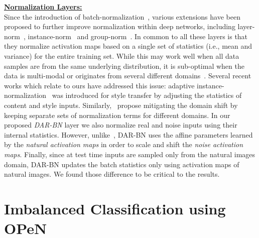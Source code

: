 \documentclass[nohyperref]{article}
\theoremstyle{plain}
\theoremstyle{definition}
\theoremstyle{remark}
\begin{document}
\noindent \textbf{\underline{Normalization Layers:}} \\
Since the introduction of batch-normalization~\cite{ioffe2015batch}, various extensions have been proposed to further improve normalization within deep networks, including layer-norm~\cite{ba2016layer}, instance-norm~\cite{ulyanov2016instance} and group-norm~\cite{wu2018group}. In common to all these layers is that they normalize activation maps based on a single set of statistics (i.e., mean and variance) for the entire training set. While this may work well when all data samples are from the same underlying distribution, it is sub-optimal when the data is multi-modal or originates from several different domains~\cite{xie2020adversarial}. Several recent works which relate to ours have addressed this issue: adaptive instance-normalization~\cite{huang2017arbitrary} was introduced for style transfer by adjusting the statistics of content and style inputs. 
Similarly,~\cite{li2018adaptive, xie2020adversarial} propose mitigating the domain shift by keeping separate sets of normalization terms for different domains. In our proposed \textit{DAR-BN} layer we also normalize real and noise inputs using their internal statistics. However, unlike~\cite{li2018adaptive,xie2020adversarial},
DAR-BN uses the affine parameters learned by the \textit{natural activation maps} in order to scale and shift the \textit{noise activation maps}. 
Finally, since at test time inputs are sampled only from the natural images domain, DAR-BN updates the batch statistics only using activation maps of natural images.
We found those difference to be critical to the results.
 
\vspace{-0.1cm}
\section{Imbalanced Classification using OPeN}
\vspace{-0.05cm}
\end{document}
